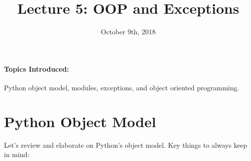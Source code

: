 \documentclass[12pt,letterpaper,twoside]{article}
\begin{document}
\title{Lecture 5: OOP and Exceptions\vspace{-5ex}}
\date{October 9th, 2018}
\maketitle

{\footnotesize
\paragraph{Topics Introduced:} Python object model, 
modules, exceptions, and object oriented programming.
}
\vspace{-3ex}
\section{Python Object Model}
Let's review and elaborate on Python's object model. Key things to
always keep in mind:
\end{document}
